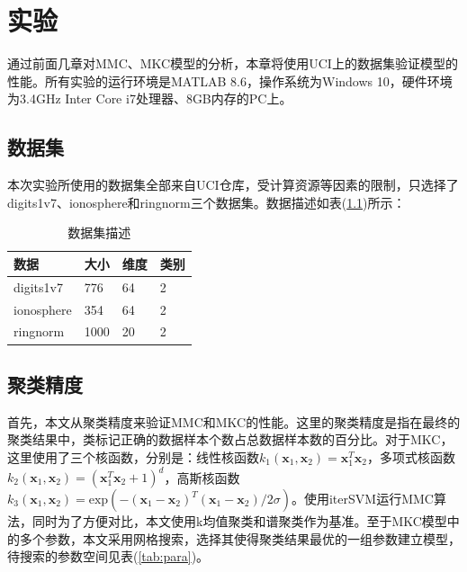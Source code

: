 \chapter{实验}
通过前面几章对MMC、MKC模型的分析，本章将使用UCI上的数据集验证模型的性能。所有实验的运行环境是MATLAB 8.6，操作系统为Windows 10，硬件环境为3.4GHz Inter Core i7处理器、8GB内存的PC上。

\section{数据集}
本次实验所使用的数据集全部来自UCI仓库，受计算资源等因素的限制，只选择了digits1v7、ionosphere和ringnorm三个数据集。数据描述如表(\ref{tab:dataset})所示：
\begin{table}[!htbp]
\caption{数据集描述}
\centering
\renewcommand\arraystretch{1.5}
\begin{tabular}{|p{3cm}<{\centering}|p{2cm}<{\centering}|p{2cm}<{\centering}|p{2cm}<{\centering}|}
\hline
数据 & 大小 & 维度 & 类别 \\
\hline 
digits1v7 & 776 & 64 & 2 \\
\hline
ionosphere & 354 & 64 & 2 \\
\hline
ringnorm & 1000 & 20 & 2 \\
\hline
\end{tabular}
\label{tab:dataset}
\end{table} 

\section{聚类精度}
首先，本文从聚类精度来验证MMC和MKC的性能。这里的聚类精度是指在最终的聚类结果中，类标记正确的数据样本个数占总数据样本数的百分比。对于MKC，这里使用了三个核函数，分别是：线性核函数$k_1(\mathbf{x}_1,\mathbf{x}_2)=\mathbf{x}_1^T\mathbf{x}_2$，多项式核函数$k_2(\mathbf{x}_1,\mathbf{x}_2)=(\mathbf{x}_1^T\mathbf{x}_2+1)^d$，高斯核函数$k_3(\mathbf{x}_1,\mathbf{x}_2)=\mathrm{exp}(-(\mathbf{x}_1-\mathbf{x}_2)^T(\mathbf{x}_1-\mathbf{x}_2)/2\sigma)$。使用iterSVM运行MMC算法，同时为了方便对比，本文使用k均值聚类和谱聚类作为基准。至于MKC模型中的多个参数，本文采用网格搜索，选择其使得聚类结果最优的一组参数建立模型，待搜索的参数空间见表(\ref{tab:para})。

